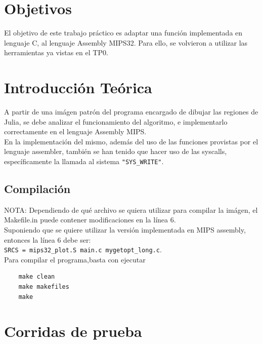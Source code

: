 

\pagestyle{empty} %

\titleGP %

\newpage

\pagestyle{plain}

\section{Objetivos}
	El objetivo de este trabajo práctico es adaptar una función implementada en lenguaje C, al lenguaje Assembly MIPS32. Para ello, se volvieron a utilizar las herramientas ya vistas en el TP0.

\section{Introducción Teórica}
  \label{sec:InfoTeo}
 A partir de una imágen patrón del programa encargado de dibujar las regiones de Julia, se debe analizar el funcionamiento del algoritmo, e implementarlo correctamente en el lenguaje Assembly MIPS.\\
 En la implementación del mismo, además del uso de las funciones provistas por el lenguaje assembler, también se han tenido que hacer uso de las syscalls, específicamente la llamada al sistema \texttt{"SYS{\_}WRITE"}.

		

\subsection{Compilación}
NOTA: Dependiendo de qué archivo se quiera utilizar para compilar la imágen, el Makefile.in puede contener modificaciones en la línea 6.\\
Suponiendo que se quiere utilizar la versión implementada en MIPS assembly, entonces la línea 6 debe ser:\\
\texttt{SRCS = mips32{\_}plot.S main.c mygetopt{\_}long.c}.\\
Para compilar el programa,basta con ejecutar 

\bigskip	
\begin{verbatim} 
	make clean
	make makefiles
	make
\end{verbatim}


\section{Corridas de prueba}

